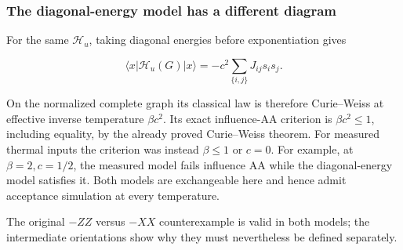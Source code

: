 \subsubsection{The diagonal-energy model has a different
diagram}\label{quant:heading-6}

For the same \(\mathcal H_u\), taking diagonal energies before
exponentiation gives

\[
\langle x|\mathcal H_u(G)|x\rangle
=-c^2\sum_{\{i,j\}}J_{ij}s_is_j.
\]

On the normalized complete graph its classical law is therefore
Curie--Weiss at effective inverse temperature \(\beta c^2\). Its exact
influence-AA criterion is \textbf{\(\beta c^2\le1\)}, including
equality, by the already proved Curie--Weiss theorem. For measured
thermal inputs the criterion was instead \(\beta\le1\) or \(c=0\). For
example, at \(\beta=2,c=1/2\), the measured model fails influence AA
while the diagonal-energy model satisfies it. Both models are
exchangeable here and hence admit acceptance simulation at every
temperature.

The original \(-ZZ\) versus \(-XX\) counterexample is valid in both
models; the intermediate orientations show why they must nevertheless be
defined separately.
